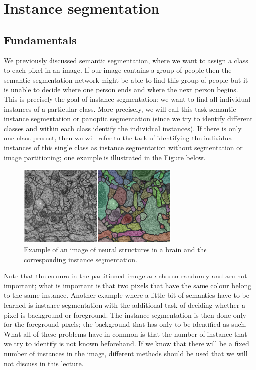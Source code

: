 \chapter{Instance segmentation}%
\label{chap:05}

\section{Fundamentals}
We previously discussed semantic segmentation, where we want to assign a class
to each pixel in an image. If our image contains a group of people then the
semantic segmentation network might be able to find this group of people but it
is unable to decide where one person ends and where the next person begins.
This is precisely the goal of instance segmentation: we want to find all
individual instances of a particular class. More precisely, we will call this
task semantic instance segmentation or panoptic segmentation (since we try to
identify different classes and within each class identify the individual
instances). If there is only one class present, then we will refer to the task
of identifying the individual instances of this single class as instance
segmentation without segmentation or image partitioning; one example is
illustrated in the Figure below.
\begin{figure}[htpb]
  \centering
  \includegraphics[width=0.7\textwidth]{Figures/instance_segmentation}
  \caption{Example of an image of neural structures in a brain and the
    corresponding instance segmentation.}%
  \label{fig:instanceseg}
\end{figure}
Note that the colours in the partitioned image are chosen randomly and are not
important; what is important is that two pixels that have the same colour belong
to the same instance. Another example where a little bit of semantics have to be
learned is instance segmentation with the additional task of deciding whether a
pixel is background or foreground. The instance segmentation is then done only
for the foreground pixels; the background that has only to be identified as
such. What all of these problems have in common is that the number of instance
that we try to identify is not known beforehand. If we know that there will be a
fixed number of instances in the image, different methods should be used that we
will not discuss in this lecture.


